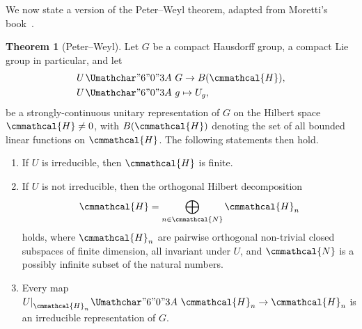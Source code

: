 \documentclass[12pt, a4 paper]{article}
\renewcommand{\symcal}{\cmmathcal}
\theoremstyle{definition}
\newtheorem{thm}{Theorem}
\newcommand{\hilbert}{\symcal{H}}
\newcommand\restr[2]{{%
        \left.\kern-\nulldelimiterspace %
        #1 %
        \littletaller %
        \right|_{#2} %
    }}
\newcommand{\littletaller}{\mathchoice{\vphantom{\big|}}{}{}{}}
\renewcommand{\colon}{\nobreak\mskip2mu\mathpunct{}\nonscript
  \mkern-\thinmuskip{\Umathchar"6 "0 "3A}\mskip6muplus1mu\relax}
\begin{document}
    We now state a version of the Peter--Weyl theorem, adapted from Moretti's book~\cite[p.~287]{MorettiFundamental}.
    \begin{thm}[Peter--Weyl]
        Let \(G\) be a compact Hausdorff group, a compact Lie group in particular, and let
        \begin{align*}
            U &\colon G \rightarrow B(\hilbert),\\
            U &\colon g \mapsto U_g,
        \end{align*}
        be a strongly-continuous unitary representation of $G$ on the Hilbert space $\hilbert \neq 0$, with $B(\hilbert)$ denoting the set of all bounded linear functions on $\hilbert$. The following statements then hold.
        \begin{enumerate}
            \item If \(U\) is irreducible, then \(\hilbert\) is finite.
            \item If \(U\) is not irreducible, then the orthogonal Hilbert decomposition
            \[
                \hilbert = \bigoplus_{n\in \symcal{N}} \hilbert_n
            \]
            holds, where \(\hilbert_n\) are pairwise orthogonal non-trivial closed subspaces of finite dimension, all invariant under \(U\), and \(\symcal{N}\) is a possibly infinite subset of the natural numbers.
            \item Every map \(\restr{U}{\hilbert_n} \colon \hilbert_n \rightarrow \hilbert_n\) is an irreducible representation of \(G\).
        \end{enumerate}
    \end{thm}
\end{document}
